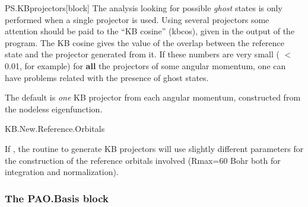 \begin{fdfentry}{PS.KBprojectors}[block]
The analysis looking for possible \textit{ghost} states is only performed
when a single projector is used.  Using several projectors some
attention should be paid to the ``KB cosine'' (kbcos), given in the
output of the program.  The KB cosine gives the value of the overlap
between the reference state and the projector generated from it.  If
these numbers are very small ( $<$ 0.01, for example) for \textbf{all}
the projectors of some angular momentum, one can have problems related
with the presence of ghost states.

The default is \emph{one} KB projector from each angular momentum,
constructed from the nodeless eigenfunction.

\end{fdfentry}  


\begin{fdflogicalF}{KB.New.Reference.Orbitals}

  If \fdftrue, the routine to generate KB projectors will use slightly
  different parameters for the construction of the reference orbitals
  involved (Rmax=60 Bohr both for integration and normalization).
  
\end{fdflogicalF}


\subsubsection{The PAO.Basis block}

